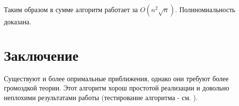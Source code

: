 \documentclass{article}
\begin{document}
Таким образом в сумме алгоритм работает за $O(n^{2} \sqrt{n})$. Полиномиальность доказана.

\section{Заключение}
Существуют и более опримальные приближения, однако они требуют более громоздкой теории. Этот алгоритм хорош простотой реализации и довольно неплохими результатами работы (тестирование алгоритма - см. \citep{github}).



\end{document}
